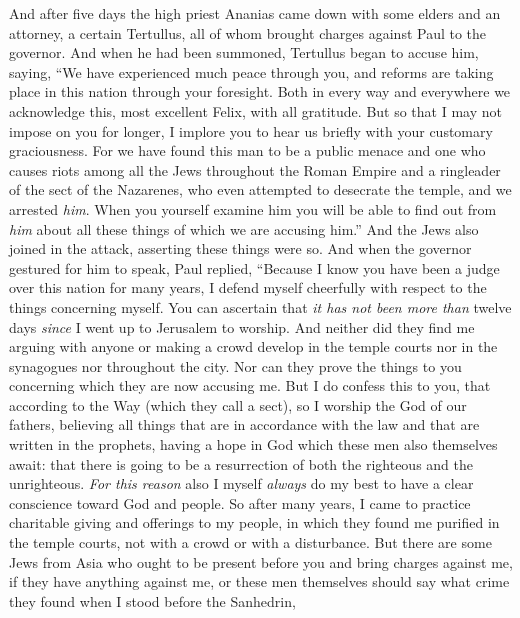 \begin{biblechapter} %
 And after five days the high priest Ananias came down with some elders and an attorney, a certain Tertullus, all of whom brought charges against Paul to the governor.
\verse And when he had been summoned, Tertullus began to accuse him, saying, “We have experienced much peace through you, and reforms are taking place in this nation through your foresight.
\verse Both in every way and everywhere we acknowledge this, most excellent Felix, with all gratitude.
\verse But so that I may not impose on you for longer, I implore you to hear us briefly with your customary graciousness.
\verse For we have found this man to be a public menace and one who causes riots among all the Jews throughout the Roman Empire and a ringleader of the sect of the Nazarenes,
\verse who even attempted to desecrate the temple, and we arrested \textit{him﻿}.
\verse When you yourself examine him you will be able to find out from \textit{him} about all these things of which we are accusing him.”
\verse And the Jews also joined in the attack, asserting these things were so.
\verse And when the governor gestured for him to speak, Paul replied, “Because I know you have been a judge over this nation for many years, I defend myself cheerfully with respect to the things concerning myself.
\verse You can ascertain that \textit{it has not been more than} twelve days \textit{since} I went up to Jerusalem to worship.
\verse And neither did they find me arguing with anyone or making a crowd develop in the temple courts nor in the synagogues nor throughout the city.
\verse Nor can they prove the things to you concerning which they are now accusing me.
\verse But I do confess this to you, that according to the Way (which they call a sect), so I worship the God of our fathers, believing all things that are in accordance with the law and that are written in the prophets,
\verse having a hope in God which these men also themselves await: that there is going to be a resurrection of both the righteous and the unrighteous.
\verse \textit{For this reason} also I myself \textit{always} do my best to have a clear conscience toward God and people.
\verse So after many years, I came to practice charitable giving and offerings to my people,
\verse in which they found me purified in the temple courts, not with a crowd or with a disturbance.
\verse But there are some Jews from Asia who ought to be present before you and bring charges against me, if they have anything against me,
\verse or these men themselves should say what crime they found when I stood before the Sanhedrin,

\end{biblechapter}
